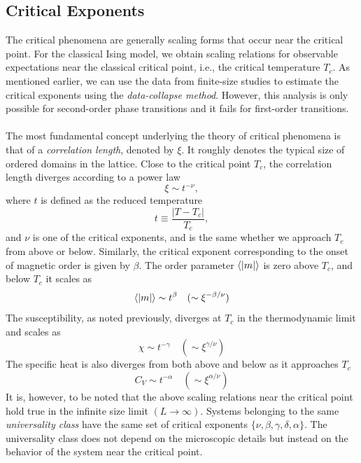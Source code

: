 \documentclass[../journal_main.tex]{subfiles}
\begin{document}
\subsection{Critical Exponents}
The critical phenomena are generally scaling forms that occur near the critical point. For the classical Ising model, we obtain scaling relations for observable expectations near the classical critical point, i.e., the critical temperature $T_c$. As mentioned earlier, we can use the data from finite-size studies to estimate the critical exponents using the \textit{data-collapse method}. However, this analysis is only possible for second-order phase transitions and it fails for first-order transitions. ~\\~\\
The most fundamental concept underlying the theory of critical phenomena is that of a \textit{correlation length}, denoted by $\xi$. It roughly denotes the typical size of ordered domains in the lattice. Close to the critical point $T_c$, the correlation length diverges according to a power law
\begin{equation}
    \xi \sim t^{-\nu},
\end{equation}
where $t$ is defined as the reduced temperature 
\begin{equation}
    t \equiv \frac{|T-T_c|}{T_c},
\end{equation}
and $\nu$ is one of the critical exponents, and is the same whether we approach $T_c$ from above or below. Similarly, the critical exponent corresponding to the onset of magnetic order is given by $\beta$. The order parameter $\expval{|m|}$ is zero above $T_c$, and below $T_c$ it scales as
\begin{equation}
    \expval{|m|} \sim t^\beta \quad (\sim \xi^{-\beta/\nu})
\end{equation}
The susceptibility, as noted previously, diverges at $T_c$ in the thermodynamic limit and scales as 
\begin{equation}
    \chi \sim t^{-\gamma} \quad (\sim \xi^{\gamma/\nu})
\end{equation} 
The specific heat is also diverges from both above and below as it approaches $T_c$ 
\begin{equation}
    C_V \sim t^{-\alpha} \quad (\sim \xi^{\alpha/\nu})
\end{equation}
It is, however, to be noted that the above scaling relations near the critical point hold true in the infinite size limit $(L \to \infty)$. Systems belonging to the same \textit{universality class} have the same set of critical exponents $\{ \nu, \beta, \gamma, \delta, \alpha \}$. The universality class does not depend on the microscopic details but instead on the behavior of the system near the critical point.
\end{document}
